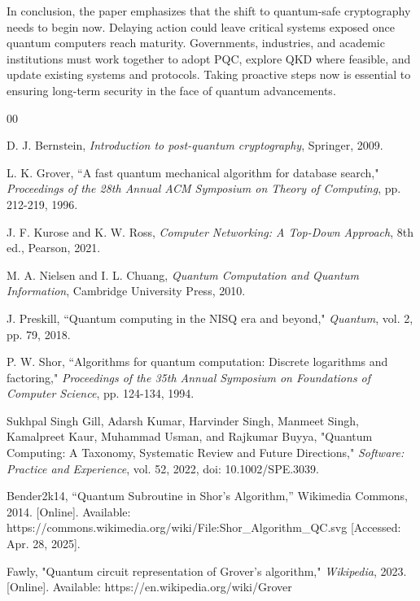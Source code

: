\documentclass[conference]{IEEEtran}
\begin{document}
In conclusion, the paper emphasizes that the shift to quantum-safe cryptography needs to begin now. Delaying action could leave critical systems exposed once quantum computers reach maturity. Governments, industries, and academic institutions must work together to adopt PQC, explore QKD where feasible, and update existing systems and protocols. Taking proactive steps now is essential to ensuring long-term security in the face of quantum advancements.
\begin{thebibliography}{00}

 D. J. Bernstein, \textit{Introduction to post-quantum cryptography}, Springer, 2009.

 L. K. Grover, ``A fast quantum mechanical algorithm for database search," \textit{Proceedings of the 28th Annual ACM Symposium on Theory of Computing}, pp. 212-219, 1996.
    
 J. F. Kurose and K. W. Ross, \textit{Computer Networking: A Top-Down Approach}, 8th ed., Pearson, 2021.
    
 M. A. Nielsen and I. L. Chuang, \textit{Quantum Computation and Quantum Information}, Cambridge University Press, 2010.
    
 J. Preskill, ``Quantum computing in the NISQ era and beyond," \textit{Quantum}, vol. 2, pp. 79, 2018.
    
 P. W. Shor, ``Algorithms for quantum computation: Discrete logarithms and factoring," \textit{Proceedings of the 35th Annual Symposium on Foundations of Computer Science}, pp. 124-134, 1994.
    
 Sukhpal Singh Gill, Adarsh Kumar, Harvinder Singh, Manmeet Singh, Kamalpreet Kaur, Muhammad Usman, and Rajkumar Buyya, "Quantum Computing: A Taxonomy, Systematic Review and Future Directions," \textit{Software: Practice and Experience}, vol. 52, 2022, doi: 10.1002/SPE.3039.
  
 Bender2k14, ``Quantum Subroutine in Shor's Algorithm,'' Wikimedia Commons, 2014. [Online]. Available: https://commons.wikimedia.org/wiki/File:Shor\_Algorithm\_QC.svg [Accessed: Apr. 28, 2025].

Fawly, "Quantum circuit representation of Grover's algorithm," \textit{Wikipedia}, 2023. [Online]. Available: https://en.wikipedia.org/wiki/Grover%


\end{thebibliography}
\end{document}
